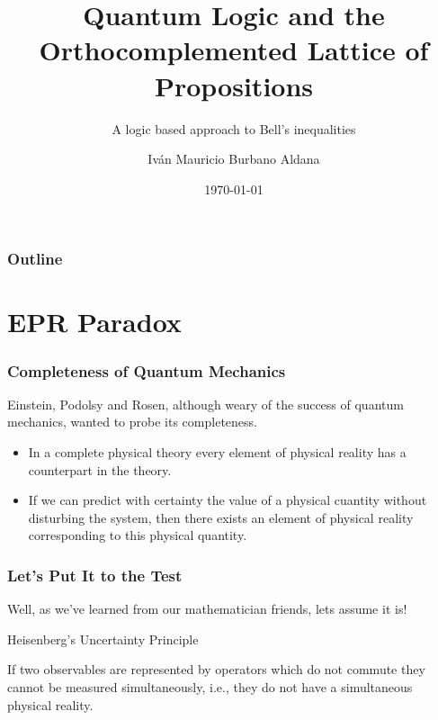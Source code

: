 \documentclass{beamer}
\title{Quantum Logic and the Orthocomplemented Lattice of Propositions}
\subtitle{A logic based approach to Bell's inequalities\cite{Burbano2017}}
\author[Iván Burbano]{Iván Mauricio Burbano Aldana}
\institute{Universidad de los Andes}
\date{\today}
\begin{document}
\begin{frame}

	\titlepage

\end{frame}

\begin{frame}

	\frametitle{Outline}
	\tableofcontents

\end{frame}

\section{EPR Paradox}

\begin{frame}

	\frametitle{Completeness of Quantum Mechanics}
	
	Einstein, Podolsy and Rosen, although weary of the success of quantum mechanics, wanted to probe its completeness\cite{Einstein1935}.
	
	\begin{itemize}
		
		\item In a complete physical theory every element of physical reality has a counterpart in the theory.		
		
		\item If we can predict with certainty the value of a physical cuantity without disturbing the system, then there exists an element of physical reality corresponding to this physical quantity.
		
	\end{itemize}

\end{frame}

\begin{frame}

	\frametitle{Let's Put It to the Test}

	Well, as we've learned from our mathematician friends, lets assume it is!
	
	\begin{block}{Heisenberg's Uncertainty Principle}

		If two observables are represented by operators which do not commute they cannot be measured simultaneously, i.e., they do not have a simultaneous physical reality\cite{Hall2013}.

	\end{block}	

\end{frame}
\end{document}
